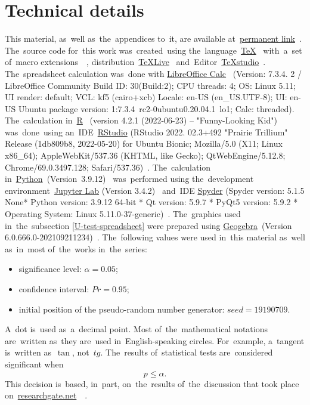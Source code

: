 \documentclass[]{scrreprt}
\begin{document}
%
\tableofcontents
\listoftables
\listoffigures
\lstlistoflistings
%	
\chapter{Technical details}
This material, as~well as~the~appendices to~it, are available at~\href{https://github.com/Kirill-Murashev/AI_for_valuers_book/tree/main/Parts-Chapters/Mann-Whitney-Wilcoxon}{permanent link}~\cite{Murashev:u-test}. The~source code for~this work was~created~using the~language~\href{https://www.ctan.org/}{\TeX}~\cite{TeX:site} with~a~set of~macro extensions~\href{https://www latex-project.org/}{\LaTeXe}~\cite{LaTeX:site}, distribution~\href{https://www.tug.org/texlive/}{TeXLive}~\cite{TeXLive:site} and~Editor~\href{https://www.texstudio.org/}{TeXstudio}~\cite{TeXstudio:site}. The~spreadsheet calculation was~done with \href{https://www.libreoffice.org/discover/calc/}{LibreOffice Calc}~\cite{LO:Calc} (Version: 7.3.4. 2 / LibreOffice Community Build ID: 30(Build:2); CPU threads: 4; OS: Linux 5.11; UI render: default; VCL: kf5 (cairo+xcb) Locale: en-US (en\_US.UTF-8); UI: en-US Ubuntu package version: 1:7.3.4~rc2-0ubuntu0.20.04.1~lo1; Calc: threaded). The~calculation in~\href{https://www.r-project.org/}{R}~\cite{R_language} (version 4.2.1 (2022-06-23) -- "Funny-Looking Kid") was~done~using an~IDE~\href{https://www.rstudio.com/}{RStudio} (RStudio 2022. 02.3+492 "Prairie Trillium" Release (1db809b8, 2022-05-20) for Ubuntu Bionic; Mozilla/5.0 (X11; Linux x86\_64); AppleWebKit/537.36 (KHTML, like Gecko); QtWebEngine/5.12.8; Chrome/69.0.3497.128; Safari/537.36)~\cite{RStudio:official_site}. The~calculation in~\href{https://www.python.org/}{Python}~(Version~3.9.12)~\cite{Python:site} was~performed using the~development environment~\href{https://jupyter.org}{Jupyter Lab} (Version 3.4.2)~\cite{Jupyter:site} and~IDE \href{https://www.spyder-ide.org/}{Spyder} (Spyder version: 5.1.5 None* Python version: 3.9.12 64-bit * Qt version: 5.9.7 * PyQt5 version: 5.9.2
* Operating System: Linux 5.11.0-37-generic)~\cite{Spyder:site}. The~graphics used in~the~subsection \ref{U-test-spreadsheet} were prepared using \href{Geogebra:official-site}{Geogebra}~(Version 6.0.666.0-202109211234)~\cite{Geogebra:official-site}. The~following values were used in~this material as~well as~in~most of~the~works in~the~series:
\begin{itemize}
	\item significance level: $\alpha = 0.05$;
	\item confidence interval: $Pr = 0.95$;
	\item initial position of the pseudo-random number generator: $seed=19190709$.
\end{itemize}
A~dot is~used as~a~decimal point. Most of~the~mathematical notations are~written as~they are~used in~English-speaking circles. For~example, a~tangent is~written as~$\tan$, not~$tg$. The~results of~statistical tests are~considered significant when
\begin{equation}\label{eq:significance}
p \leq \alpha.
\end{equation}
This decision is~based, in~part, on~the~results of~the~discussion that took place on~\href{researchgate.net}{researchgate.net}~~\cite{RG:p-equals-alpha}.
%
\end{document}
